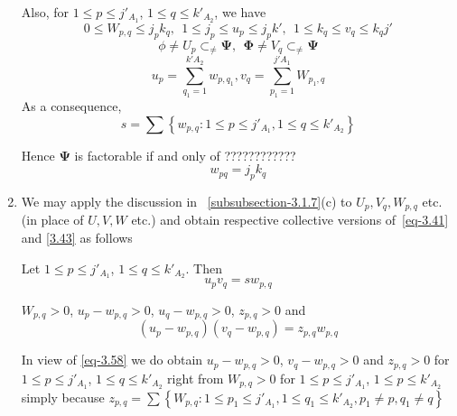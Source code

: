 \documentclass[a4paper,12pt]{article}
\theoremstyle{definition}
\theoremstyle{underlinethm}
\theoremstyle{definition}
\begin{document}
\begin{enumerate}[label=(\alph*)]
Also, for $1 \leq p \leq j'_{A_{1}}$, $1 \leq q \leq k'_{A_{2}}$, we have
\begin{equation}
0 \leq W_{p,q} \leq j_{p}k_{q},~~1 \leq j_{p} \leq u_{p} \leq j_{p}k',~~ 1 \leq k_{q} \leq v_{q} \leq k_{q}j'\tag{3.63}\label{eq-3.63}
\end{equation}
\begin{equation}
\phi \neq U_{p} \subset_{\neq} \boldsymbol{\Psi},~~ \boldsymbol{\Phi} \neq V_{q} \subset_{\neq} \boldsymbol{\Psi}\tag{3.64}\label{eq-3.64}
\end{equation}
\begin{equation}
u_{p}= \sum_{q_{1}=1}^{k'A_{2}} w_{p,q_{1}}, v_{q}=\sum_{p_{1}=1}^{j' A_{1}}W_{p_{1}, q}\tag{3.65}\label{eq-3.35}
\end{equation}
As a consequence,
\begin{equation}
s =\sum \left\{w_{p,q} : 1 \leq p \leq j'_{A_{1}}, 1 \leq q \leq k'_{A_{2}}\right\}\tag{3.66}\label{eq-3.66}
\end{equation}

Hence $\boldsymbol{\Psi}$ is factorable if and only of ????????????
\begin{equation}
w_{pq} = j_{p}k_{q}\tag{3.67}\label{eq-3.67}
\end{equation}

\item We may apply the discussion in ~\eqref{subsubsection-3.1.7}(c) to $U_{p}, V_{q}, W_{p,q}$ etc. (in place of $U, V, W$ etc.) and obtain respective collective versions of~\eqref{eq-3.41} and \eqref{3.43} as follows

Let $1 \leq p \leq j'_{A_{1}}$, $1 \leq q \leq k'_{A_{2}}$. Then
\begin{equation}
u_{p}v_{q} = sw_{p,q}\tag{3.38}\label{eq-3.68}
\end{equation} 

$W_{p,q}>0$, $u_{p}-w_{p,q} > 0$, $u_{q}-w_{p,q} > 0$, $z_{p,q}>0$ and 
\begin{equation}
(u_{p}-w_{p,q})(v_{q}-w_{p,q}) = z_{p,q}w_{p,q}\tag{3.69}\label{eq-3.69}
\end{equation}

In view of \eqref{eq-3.58} we do obtain $u_{p}-w_{p,q}>0$, $v_{q}-w_{p,q}>0$ and $z_{p,q} >0$ for $1 \leq p \leq j'_{A_{1}}$, $1 \leq q \leq k'_{A_{2}}$ right from $W_{p,q}>0$ for $1 \leq p \leq j'_{A_{1}}$, $1 \leq p \leq k'_{A_{2}}$ simply because $z_{p,q} = \sum \left\{W_{p,q} : 1 \leq p_{1} \leq j'_{A_{1}}, 1 \leq q_{1} \leq k'_{A_{2}}, p_{1} \neq p, q_{1} \neq q \right\}$


\end{enumerate}
\end{document}

